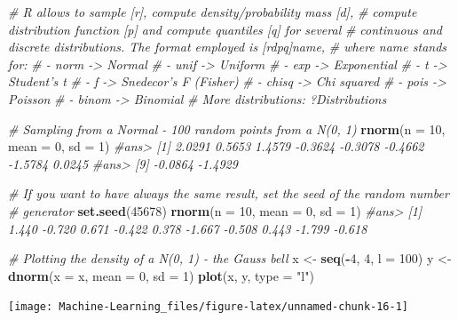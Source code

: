 \documentclass[]{book}
\newenvironment{Shaded}{\begin{snugshade}}{\end{snugshade}}
\newcommand{\KeywordTok}[1]{\textcolor[rgb]{0.13,0.29,0.53}{\textbf{#1}}}
\newcommand{\DataTypeTok}[1]{\textcolor[rgb]{0.13,0.29,0.53}{#1}}
\newcommand{\DecValTok}[1]{\textcolor[rgb]{0.00,0.00,0.81}{#1}}
\newcommand{\StringTok}[1]{\textcolor[rgb]{0.31,0.60,0.02}{#1}}
\newcommand{\CommentTok}[1]{\textcolor[rgb]{0.56,0.35,0.01}{\textit{#1}}}
\newcommand{\OperatorTok}[1]{\textcolor[rgb]{0.81,0.36,0.00}{\textbf{#1}}}
\newcommand{\NormalTok}[1]{#1}
\begin{document}
\begin{Shaded}
\begin{Highlighting}[]
\CommentTok{# R allows to sample [r], compute density/probability mass [d],}
\CommentTok{# compute distribution function [p] and compute quantiles [q] for several}
\CommentTok{# continuous and discrete distributions. The format employed is [rdpq]name,}
\CommentTok{# where name stands for:}
\CommentTok{# - norm -> Normal}
\CommentTok{# - unif -> Uniform}
\CommentTok{# - exp -> Exponential}
\CommentTok{# - t -> Student's t}
\CommentTok{# - f -> Snedecor's F (Fisher)}
\CommentTok{# - chisq -> Chi squared}
\CommentTok{# - pois -> Poisson}
\CommentTok{# - binom -> Binomial}
\CommentTok{# More distributions: ?Distributions}


\CommentTok{# Sampling from a Normal - 100 random points from a N(0, 1)}
\KeywordTok{rnorm}\NormalTok{(}\DataTypeTok{n =} \DecValTok{10}\NormalTok{, }\DataTypeTok{mean =} \DecValTok{0}\NormalTok{, }\DataTypeTok{sd =} \DecValTok{1}\NormalTok{)}
\CommentTok{#ans>  [1]  2.0291  0.5653  1.4579 -0.3624 -0.3078 -0.4662 -1.5784  0.0245}
\CommentTok{#ans>  [9] -0.0864 -1.4929}

\CommentTok{# If you want to have always the same result, set the seed of the random number}
\CommentTok{# generator}
\KeywordTok{set.seed}\NormalTok{(}\DecValTok{45678}\NormalTok{)}
\KeywordTok{rnorm}\NormalTok{(}\DataTypeTok{n =} \DecValTok{10}\NormalTok{, }\DataTypeTok{mean =} \DecValTok{0}\NormalTok{, }\DataTypeTok{sd =} \DecValTok{1}\NormalTok{)}
\CommentTok{#ans>  [1]  1.440 -0.720  0.671 -0.422  0.378 -1.667 -0.508  0.443 -1.799 -0.618}

\CommentTok{# Plotting the density of a N(0, 1) - the Gauss bell}
\NormalTok{x <-}\StringTok{ }\KeywordTok{seq}\NormalTok{(}\OperatorTok{-}\DecValTok{4}\NormalTok{, }\DecValTok{4}\NormalTok{, }\DataTypeTok{l =} \DecValTok{100}\NormalTok{)}
\NormalTok{y <-}\StringTok{ }\KeywordTok{dnorm}\NormalTok{(}\DataTypeTok{x =}\NormalTok{ x, }\DataTypeTok{mean =} \DecValTok{0}\NormalTok{, }\DataTypeTok{sd =} \DecValTok{1}\NormalTok{)}
\KeywordTok{plot}\NormalTok{(x, y, }\DataTypeTok{type =} \StringTok{"l"}\NormalTok{)}
\end{Highlighting}
\end{Shaded}

\begin{center}\texttt{[image: Machine-Learning\_files/figure-latex/unnamed-chunk-16-1]} \end{center}
\end{document}
